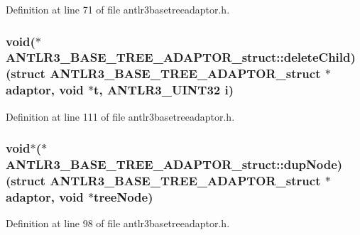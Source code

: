 Definition at line 71 of file antlr3basetreeadaptor.\-h.

\hypertarget{struct_a_n_t_l_r3___b_a_s_e___t_r_e_e___a_d_a_p_t_o_r__struct_a18d77510ec9da77e91c161c661273f7b}{
\subsubsection[{delete\-Child}]{\setlength{\rightskip}{0pt plus 5cm}void($\ast$ A\-N\-T\-L\-R3\-\_\-\-B\-A\-S\-E\-\_\-\-T\-R\-E\-E\-\_\-\-A\-D\-A\-P\-T\-O\-R\-\_\-struct\-::delete\-Child)(struct {\bf A\-N\-T\-L\-R3\-\_\-\-B\-A\-S\-E\-\_\-\-T\-R\-E\-E\-\_\-\-A\-D\-A\-P\-T\-O\-R\-\_\-struct} $\ast$adaptor, void $\ast${\bf t}, {\bf A\-N\-T\-L\-R3\-\_\-\-U\-I\-N\-T32} {\bf i})}}\label{struct_a_n_t_l_r3___b_a_s_e___t_r_e_e___a_d_a_p_t_o_r__struct_a18d77510ec9da77e91c161c661273f7b}


Definition at line 111 of file antlr3basetreeadaptor.\-h.

\hypertarget{struct_a_n_t_l_r3___b_a_s_e___t_r_e_e___a_d_a_p_t_o_r__struct_acf27d8e1b968febb15630345961af373}{
\subsubsection[{dup\-Node}]{\setlength{\rightskip}{0pt plus 5cm}void$\ast$($\ast$ A\-N\-T\-L\-R3\-\_\-\-B\-A\-S\-E\-\_\-\-T\-R\-E\-E\-\_\-\-A\-D\-A\-P\-T\-O\-R\-\_\-struct\-::dup\-Node)(struct {\bf A\-N\-T\-L\-R3\-\_\-\-B\-A\-S\-E\-\_\-\-T\-R\-E\-E\-\_\-\-A\-D\-A\-P\-T\-O\-R\-\_\-struct} $\ast$adaptor, void $\ast$tree\-Node)}}\label{struct_a_n_t_l_r3___b_a_s_e___t_r_e_e___a_d_a_p_t_o_r__struct_acf27d8e1b968febb15630345961af373}


Definition at line 98 of file antlr3basetreeadaptor.\-h.

